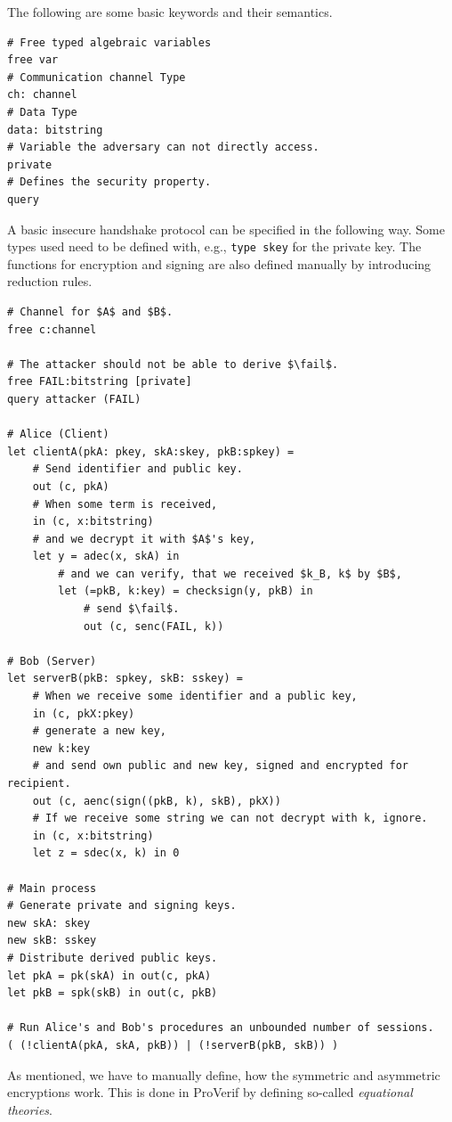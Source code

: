 The following are some basic keywords and their semantics.

\begin{lstlisting}
# Free typed algebraic variables
free var
# Communication channel Type
ch: channel
# Data Type
data: bitstring
# Variable the adversary can not directly access.
private
# Defines the security property.
query
\end{lstlisting}

A basic insecure handshake protocol can be specified in the following way.
Some types used need to be defined with, e.g., \lstinline|type skey| for the private key.
The functions for encryption and signing are also defined manually by introducing reduction rules.

\begin{lstlisting}
# Channel for $A$ and $B$.
free c:channel

# The attacker should not be able to derive $\fail$.
free FAIL:bitstring [private]
query attacker (FAIL)

# Alice (Client)
let clientA(pkA: pkey, skA:skey, pkB:spkey) =
    # Send identifier and public key.
    out (c, pkA)
    # When some term is received,
    in (c, x:bitstring)
    # and we decrypt it with $A$'s key,
    let y = adec(x, skA) in
        # and we can verify, that we received $k_B, k$ by $B$,
        let (=pkB, k:key) = checksign(y, pkB) in
            # send $\fail$.
            out (c, senc(FAIL, k))

# Bob (Server)
let serverB(pkB: spkey, skB: sskey) =
    # When we receive some identifier and a public key,
    in (c, pkX:pkey)
    # generate a new key,
    new k:key
    # and send own public and new key, signed and encrypted for recipient.
    out (c, aenc(sign((pkB, k), skB), pkX))
    # If we receive some string we can not decrypt with k, ignore.
    in (c, x:bitstring)
    let z = sdec(x, k) in 0

# Main process
# Generate private and signing keys.
new skA: skey
new skB: sskey
# Distribute derived public keys.
let pkA = pk(skA) in out(c, pkA)
let pkB = spk(skB) in out(c, pkB)

# Run Alice's and Bob's procedures an unbounded number of sessions.
( (!clientA(pkA, skA, pkB)) | (!serverB(pkB, skB)) )
\end{lstlisting}

As mentioned, we have to manually define, how the symmetric and asymmetric encryptions work.
This is done in ProVerif by defining so-called \emph{equational theories}.

